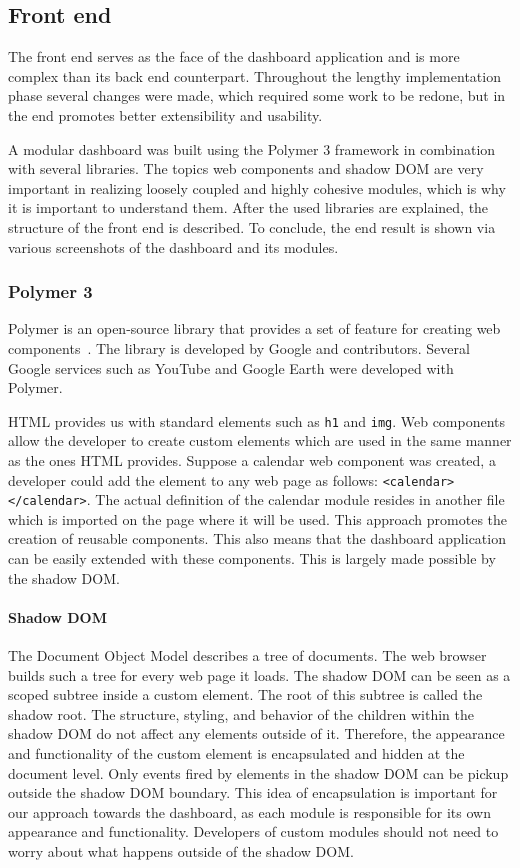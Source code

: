     \subsection{Front end}

    The front end serves as the face of the dashboard application and is more complex than its back end counterpart. Throughout the lengthy implementation phase several changes were made, which required some work to be redone, but in the end promotes better extensibility and usability. 
    
    A modular dashboard was built using the Polymer 3 framework in combination with several libraries. The topics web components and shadow DOM are very important in realizing loosely coupled and highly cohesive modules, which is why it is important to understand them. After the used libraries are explained, the structure of the front end is described. To conclude, the end result is shown via various screenshots of the dashboard and its modules.

        \subsubsection{Polymer 3}

        Polymer is an open-source library that provides a set of feature for creating web components~\cite{Polymer}. The library is developed by Google and contributors. Several Google services such as YouTube and Google Earth were developed with Polymer.

        HTML provides us with standard elements such as \texttt{h1} and \texttt{img}. Web components allow the developer to create custom elements which are used in the same manner as the ones HTML provides. Suppose a calendar web component was created, a developer could add the element to any web page as follows: \texttt{<calendar></calendar>}. The actual definition of the calendar module resides in another file which is imported on the page where it will be used. This approach promotes the creation of reusable components. This also means that the dashboard application can be easily extended with these components. This is largely made possible by the shadow DOM\@.

        \paragraph{Shadow DOM} The Document Object Model describes a tree of documents. The web browser builds such a tree for every web page it loads. The shadow DOM can be seen as a scoped subtree inside a custom element. The root of this subtree is called the shadow root. The structure, styling, and behavior of the children within the shadow DOM do not affect any elements outside of it. Therefore, the appearance and functionality of the custom element is encapsulated and hidden at the document level. Only events fired by elements in the shadow DOM can be pickup outside the shadow DOM boundary. This idea of encapsulation is important for our approach towards the dashboard, as each module is responsible for its own appearance and functionality. Developers of custom modules should not need to worry about what happens outside of the shadow DOM\@.

